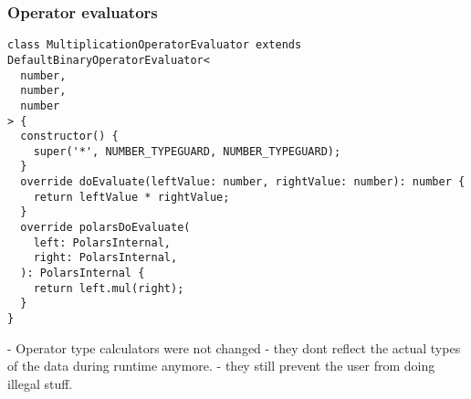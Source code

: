 \subsubsection{Operator evaluators}
\label{subsubsection:impl:operator_evaluator}
\begin{listing}
	\begin{verbatim}
class MultiplicationOperatorEvaluator extends DefaultBinaryOperatorEvaluator<
  number,
  number,
  number
> {
  constructor() {
    super('*', NUMBER_TYPEGUARD, NUMBER_TYPEGUARD);
  }
  override doEvaluate(leftValue: number, rightValue: number): number {
    return leftValue * rightValue;
  }
  override polarsDoEvaluate(
    left: PolarsInternal,
    right: PolarsInternal,
  ): PolarsInternal {
    return left.mul(right);
  }
}
	\end{verbatim}

\end{listing}





- Operator type calculators were not changed
- they dont reflect the actual types of the data during runtime anymore.
- they still prevent the user from doing illegal stuff.



